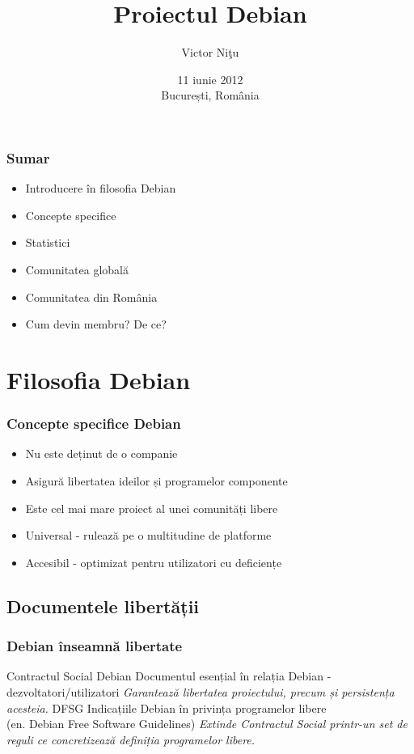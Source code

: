 \documentclass[xcolor=dvipsnames]{beamer}
\title[Un proiect universal, cu o comunitate globală]{Proiectul Debian}
\author{Victor Ni\c{t}u}
\institute[Ceata, Debian România]
{
Fundația Ceata\\Comunitatea Debian din Rom\^{a}nia\\
\medskip
{\emph{victor@debian-linux.ro}}
}
\date{11 iunie 2012\\București, România}
\begin{document}
%
\begin{frame}
\titlepage
\end{frame}
%
\begin{frame}
\frametitle{Sumar}
\begin{itemize}
\item Introducere în filosofia Debian
\item Concepte specifice
\item Statistici
\item Comunitatea globală
\item Comunitatea din România
\item Cum devin membru? De ce?
\end{itemize}
\end{frame}
%
\section{Filosofia Debian}
\begin{frame}
\frametitle{Concepte specifice Debian}
\begin{block}{}
\begin{itemize}
\item Nu este deținut de o companie
\item Asigură libertatea ideilor și programelor componente
\item Este cel mai mare proiect al unei comunități libere
\item Universal - rulează pe o multitudine de platforme
\item Accesibil - optimizat pentru utilizatori cu deficiențe
\end{itemize}
\end{block}
\end{frame}

\subsection{Documentele libertății}
\begin{frame}
\frametitle{Debian înseamnă libertate}
\footnotesize{
\begin{thebibliography}{99}
  Contractul Social Debian
 \newblock Documentul esențial în relația Debian - dezvoltatori/utilizatori
 \newblock \emph{Garantează libertatea proiectului, precum și persistența acesteia.}
  DFSG
 \newblock Indicațiile Debian în privința programelor libere \\
 (en. Debian Free Software Guidelines)
 \newblock \emph{Extinde Contractul Social printr-un set de reguli ce concretizează definiția programelor libere.}
\end{thebibliography}
}
\end{frame}
%
\end{document}
